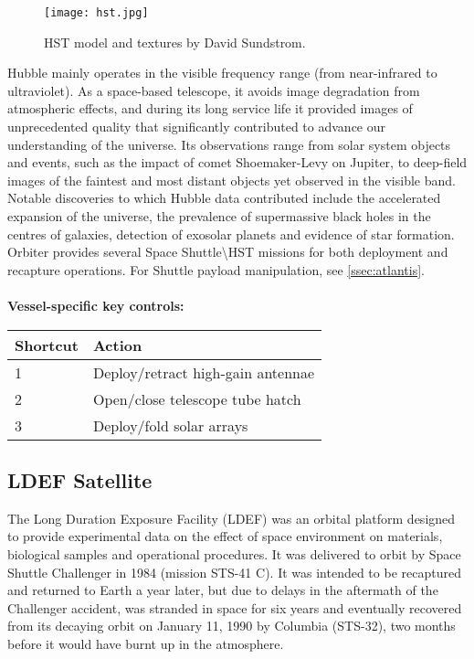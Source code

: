 \documentclass[Orbiter User Manual.tex]{subfiles}
\begin{document}
\begin{figure}[H]
  \centering
  \texttt{[image: hst.jpg]}
  \caption{HST model and textures by David Sundstrom.}
\end{figure}

\noindent
Hubble mainly operates in the visible frequency range (from near-infrared to ultraviolet). As a space-based telescope, it avoids image degradation from atmospheric effects, and during its long service life it provided images of unprecedented quality that significantly contributed to advance our understanding of the universe. Its observations range from solar system objects and events, such as the impact of comet Shoemaker-Levy on Jupiter, to deep-field images of the faintest and most distant objects yet observed in the visible band. Notable discoveries to which Hubble data contributed include the accelerated expansion of the universe, the prevalence of supermassive black holes in the centres of galaxies, detection of exosolar planets and evidence of star formation.\\
Orbiter provides several Space Shuttle\textbackslash HST missions for both deployment and recapture operations. For Shuttle payload manipulation, see \ref{ssec:atlantis}.\\
\\
\textbf{Vessel-specific key controls:}

	\begin{longtable}{ |p{}|p{}| }
	\hline\rule{0pt}{2ex}
	\textbf{Shortcut} & \textbf{Action}\\
	\hline\rule{0pt}{2ex}
	1 & Deploy/retract high-gain antennae\\
	\hline\rule{0pt}{2ex}
	2 & Open/close telescope tube hatch\\
	\hline\rule{0pt}{2ex}
	3 & Deploy/fold solar arrays\\
	\hline
	\end{longtable}


\subsection{LDEF Satellite}
The Long Duration Exposure Facility (LDEF) was an orbital platform designed to provide experimental data on the effect of space environment on materials, biological samples and operational procedures. It was delivered to orbit by Space Shuttle Challenger in 1984 (mission STS-41 C). It was intended to be recaptured and returned to Earth a year later, but due to delays in the aftermath of the Challenger accident, was stranded in space for six years and eventually recovered from its decaying orbit on January 11, 1990 by Columbia (STS-32), two months before it would have burnt up in the atmosphere.
\end{document}
